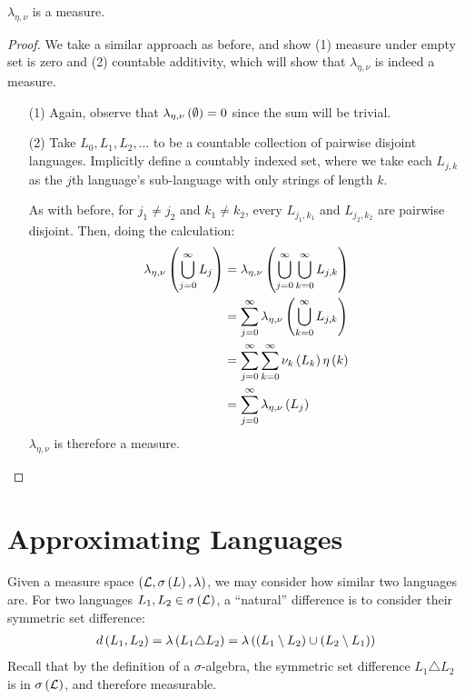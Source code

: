 \documentclass[12pt]{article}
\begin{document}
\begin{theorem}
  \(\lambda_{\eta, \nu}\) is a measure.
\end{theorem}
\begin{proof}
  We take a similar approach as before, and show
  (1) measure under empty set is zero and
  (2) countable additivity,
  which will show that \(\lambda_{\eta, \nu}\) is indeed a measure.

  \begin{enumerate}
    \item[(1)]
      Again, observe that \(\lambda_{\eta, \nu} \left(\emptyset\right) = 0\)
      since the sum will be trivial.

    \item[(2)]
      Take \(L_0, L_1, L_2, \ldots\) to be a countable collection of
      pairwise disjoint languages.
      Implicitly define a countably indexed set,
      where we take each \(L_{j, k}\) as the \(j\)th language's
      sub-language with only strings of length \(k\).

      As with before, for \(j_1 \neq j_2\) and \(k_1 \neq k_2\),
      every \(L_{j_1, k_1}\) and \(L_{j_2, k_2}\) are pairwise disjoint.
      Then, doing the calculation:
      \begin{align*}
        \lambda_{\eta, \nu} \left(\bigcup_{j = 0}^{\infty} L_j\right)
          &= \lambda_{\eta, \nu} \left(\bigcup_{j = 0}^{\infty}
                            \bigcup_{k = 0}^{\infty} L_{j, k}\right) \\
          &= \sum_{j = 0}^{\infty}
              \lambda_{\eta, \nu} \left(\bigcup_{k = 0}^{\infty} L_{j, k}\right) \\
          &= \sum_{j = 0}^{\infty}
              \sum_{k = 0}^{\infty}
                \nu_k \left(L_k\right) \eta\left(k\right) \\
          &= \sum_{j = 0}^{\infty} \lambda_{\eta, \nu} \left(L_j\right)
        \end{align*}
      \(\lambda_{\eta, \nu}\) is therefore a measure.
  \end{enumerate}
\end{proof}


\section{Approximating Languages}
Given a measure space
\(\left(\mathcal{L}, \sigma\left(L\right), \lambda\right)\),
we may consider how similar two languages are.
For two languages \(L_1, L_2 \in \sigma\left(\mathcal{L}\right)\),
a ``natural'' difference is to consider their
symmetric set difference:
\begin{align*}
  d\left(L_1, L_2\right)
    = \lambda\left(L_1 \triangle L_2\right)
    = \lambda\left(\left(L_1 \setminus L_2\right) \cup \left(L_2 \setminus L_1\right)\right)
\end{align*}
Recall that by the definition of a \(\sigma\)-algebra,
the symmetric set difference \(L_1 \triangle L_2\)
is in \(\sigma\left(\mathcal{L}\right)\), and therefore measurable.
\end{document}
